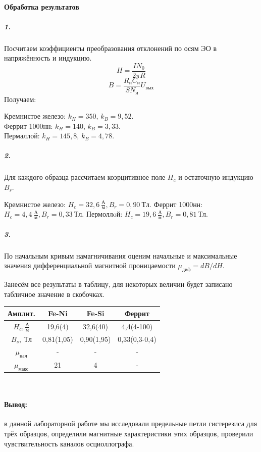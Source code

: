 \documentclass[a4paper,12pt]{article}
\begin{document}
\paragraph{Обработка результатов\\}
\subparagraph{1.}Посчитаем коэффициенты преобразования отклонений по осям ЭО в напряжённость и индукцию.
\begin{equation}
    H=\frac{IN_0}{2\pi R}
\end{equation}
\begin{equation}
    B=\frac{R_и C_и}{SN_и}U_{вых}
\end{equation}
Получаем:
\begin{center}
Кремнистое железо: $k_{H} = 350$, $k_{B} = 9,52$.\\
Феррит 1000нн: $k_{H} = 140$, $k_{B} = 3,33$.\\
Пермаллой: $k_{H} = 145,8$, $k_{B} = 4,78$.
\end{center}


\subparagraph{2.} Для каждого образца рассчитаем коэрцитивное поле $H_c$ и остаточную индукцию $B_r$.
\begin{center}
    Кремнистое железо:  $H_c = 32,6 ~ \frac{А}{м}, B_r = 0,90~ Тл$.
    Феррит 1000нн: $H_c = 4,4 ~ \frac{А}{м}, B_r = 0,33~ Тл$.
    Пермоллoй: $H_c = 19,6 ~ \frac{А}{м}, B_r = 0,81~ Тл$.
\end{center}
\subparagraph{3.}По начальным кривым намагничивания оценим начальные и максимальные значения дифференциальной магнитной проницаемости $\mu_{диф}=dB/dH$.\par
Занесём все результаты в таблицу, для некоторых величин будет записано табличное значение в скобочках.
\begin{center}
\begin{tabular}{|c|c|c|c|}
\hline
Амплит. & Fe-Ni & Fe-Si & Феррит \\ \hline
$H_c, \frac{А}{м}$ & 19,6(4) & 32,6(40) & 4,4(4-100) \\ \hline
$B_s,~ Тл$ & 0,81(1,05) & 0,90(1,95) & 0,33(0,3-0,4) \\ \hline
$\mu_{нач}$ & - & - & - \\ \hline
$\mu_{макс}$ & 21 & 4  & -\\ \hline
\end{tabular}\\
\end{center}
\paragraph{Вывод:}в данной лабораторной работе мы исследовали предельные петли гистерезиса для трёх образцов, определили магнитные характеристики этих образцов, проверили чувствительность каналов осциоллографа.
\end{document}
